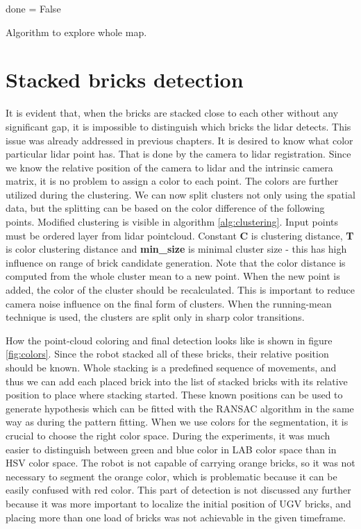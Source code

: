 \begin{algorithm}[H]
	done = False\;
	\caption{Algorithm to explore whole map.}
	\label{alg:exploration}
\end{algorithm}

\section{Stacked bricks detection}
It is evident that, when the bricks are stacked close to each other without any significant gap, it is impossible to distinguish which bricks the lidar detects. This issue was already addressed in previous chapters. It is desired to know what color particular lidar point has. That is done by the camera to lidar registration. Since we know the relative position of the camera to lidar and the intrinsic camera matrix, it is no problem to assign a color to each point. The colors are further utilized during the clustering. We can now split clusters not only using the spatial data, but the splitting can be based on the color difference of the following points. Modified clustering is visible in algorithm \ref{alg:clustering}. Input points must be ordered layer from lidar pointcloud. Constant \textbf{C} is clustering distance, \textbf{T} is color clustering distance and \textbf{min\_size} is minimal cluster size - this has high influence on range of brick candidate generation. Note that the color distance is computed from the whole cluster mean to a new point. When the new point is added, the color of the cluster should be recalculated. This is important to reduce camera noise influence on the final form of clusters. When the running-mean technique is used, the clusters are split only in sharp color transitions. 

How the point-cloud coloring and final detection looks like is shown in figure  \ref{fig:colors}. Since the robot stacked all of these bricks, their relative position should be known. Whole stacking is a predefined sequence of movements, and thus we can add each placed brick into the list of stacked bricks with its relative position to place where stacking started. These known positions can be used to generate hypothesis which can be fitted with the RANSAC algorithm in the same way as during the pattern fitting. When we use colors for the segmentation, it is crucial to choose the right color space. During the experiments, it was much easier to distinguish between green and blue color in LAB color space than in HSV color space. The robot is not capable of carrying orange bricks, so it was not necessary to segment the orange color, which is problematic because it can be easily confused with red color. This part of detection is not discussed any further because it was more important to localize the initial position of UGV bricks, and placing more than one load of bricks was not achievable in the given timeframe.

